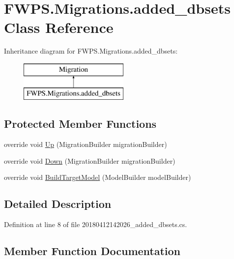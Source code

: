 \hypertarget{class_f_w_p_s_1_1_migrations_1_1added__dbsets}{}\section{F\+W\+P\+S.\+Migrations.\+added\+\_\+dbsets Class Reference}
\label{class_f_w_p_s_1_1_migrations_1_1added__dbsets}
Inheritance diagram for F\+W\+P\+S.\+Migrations.\+added\+\_\+dbsets\+:\begin{figure}[H]
\begin{center}
\leavevmode
\includegraphics[height=2.000000cm]{class_f_w_p_s_1_1_migrations_1_1added__dbsets}
\end{center}
\end{figure}
\subsection*{Protected Member Functions}
\begin{DoxyCompactItemize}
\item 
override void \mbox{\hyperlink{class_f_w_p_s_1_1_migrations_1_1added__dbsets_a23337e6639d958dff4e8963ea7792266}{Up}} (Migration\+Builder migration\+Builder)
\item 
override void \mbox{\hyperlink{class_f_w_p_s_1_1_migrations_1_1added__dbsets_a6c95648c6725a5dac262bfe807ad7a02}{Down}} (Migration\+Builder migration\+Builder)
\item 
override void \mbox{\hyperlink{class_f_w_p_s_1_1_migrations_1_1added__dbsets_a3db21f9c71032f57458e5743e4a19fe4}{Build\+Target\+Model}} (Model\+Builder model\+Builder)
\end{DoxyCompactItemize}


\subsection{Detailed Description}


Definition at line 8 of file 20180412142026\+\_\+added\+\_\+dbsets.\+cs.



\subsection{Member Function Documentation}
\mbox{\label{class_f_w_p_s_1_1_migrations_1_1added__dbsets_a3db21f9c71032f57458e5743e4a19fe4}} 
